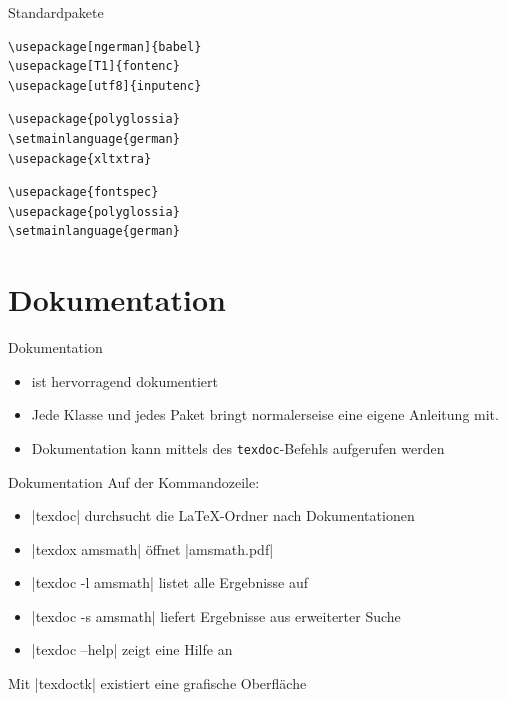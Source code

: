 \documentclass[
	vorläufig=true,
	datum=2016-10-28,
	titel={Allgemeine Formatierung und Pakete},
	web=true,
]{../tex/latexkurs-slides}
\begin{document}
\begin{frame}[fragile]{Standardpakete}
\begin{lstlisting}
\usepackage[ngerman]{babel}
\usepackage[T1]{fontenc}
\usepackage[utf8]{inputenc}
\end{lstlisting}
\vfill
\XeLaTeX {}
\begin{lstlisting}
\usepackage{polyglossia}
\setmainlanguage{german}
\usepackage{xltxtra}
\end{lstlisting}
\vfill
{}
\begin{lstlisting}
\usepackage{fontspec}
\usepackage{polyglossia}
\setmainlanguage{german}
\end{lstlisting}
\end{frame}

\section{Dokumentation}
\begin{frame}{Dokumentation}
	\begin{itemize}
		\item {} ist hervorragend dokumentiert
		\item Jede Klasse und jedes Paket bringt normalerseise eine eigene Anleitung mit.
		\item Dokumentation kann mittels des \texttt{texdoc}-Befehls aufgerufen werden
	\end{itemize}
\end{frame}

\begin{frame}[fragile]{Dokumentation}
	Auf der Kommandozeile:
	\begin{itemize}
		\item |texdoc| durchsucht die \LaTeX-Ordner nach Dokumentationen
		\item |texdox amsmath| öffnet |amsmath.pdf|
		\item |texdoc -l amsmath| listet alle Ergebnisse auf
		\item |texdoc -s amsmath| liefert Ergebnisse aus erweiterter Suche
		\item |texdoc --help| zeigt eine Hilfe an
	\end{itemize}
	Mit |texdoctk| existiert eine grafische Oberfläche
\end{frame}
\end{document}
